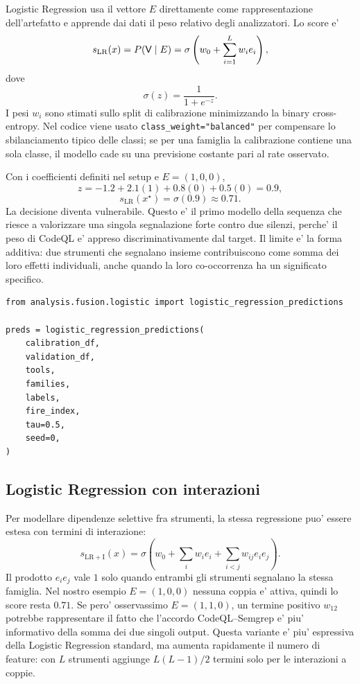 Logistic Regression usa il vettore $E$ direttamente come rappresentazione dell'artefatto e apprende dai dati il peso relativo degli analizzatori. Lo score e'
\begin{equation}
s_{\mathrm{LR}}(x)=P(\mathsf{V}\mid E)=\sigma\left(w_0+\sum_{i=1}^{L}w_i e_i\right),
\end{equation}
dove
\begin{equation}
\sigma(z)=\frac{1}{1+e^{-z}}.
\end{equation}
I pesi $w_i$ sono stimati sullo split di calibrazione minimizzando la binary cross-entropy. Nel codice viene usato \texttt{class\_weight="balanced"} per compensare lo sbilanciamento tipico delle classi; se per una famiglia la calibrazione contiene una sola classe, il modello cade su una previsione costante pari al rate osservato.

Con i coefficienti definiti nel setup e $E=(1,0,0)$,
\begin{equation}
z=-1.2+2.1(1)+0.8(0)+0.5(0)=0.9,
\end{equation}
\begin{equation}
s_{\mathrm{LR}}(x^\star)=\sigma(0.9)\approx 0.71.
\end{equation}
La decisione diventa vulnerabile. Questo e' il primo modello della sequenza che riesce a valorizzare una singola segnalazione forte contro due silenzi, perche' il peso di CodeQL e' appreso discriminativamente dal target. Il limite e' la forma additiva: due strumenti che segnalano insieme contribuiscono come somma dei loro effetti individuali, anche quando la loro co-occorrenza ha un significato specifico.

\begin{lstlisting}[caption={Implementazione Logistic Regression in analysis/fusion/logistic.py}]
from analysis.fusion.logistic import logistic_regression_predictions

preds = logistic_regression_predictions(
    calibration_df,
    validation_df,
    tools,
    families,
    labels,
    fire_index,
    tau=0.5,
    seed=0,
)
\end{lstlisting}

\subsection{Logistic Regression con interazioni}

Per modellare dipendenze selettive fra strumenti, la stessa regressione puo' essere estesa con termini di interazione:
\begin{equation}
s_{\mathrm{LR+I}}(x)=
\sigma\left(
w_0+\sum_i w_i e_i+\sum_{i<j}w_{ij}e_i e_j
\right).
\end{equation}
Il prodotto $e_i e_j$ vale $1$ solo quando entrambi gli strumenti segnalano la stessa famiglia. Nel nostro esempio $E=(1,0,0)$ nessuna coppia e' attiva, quindi lo score resta $0.71$. Se pero' osservassimo $E=(1,1,0)$, un termine positivo $w_{12}$ potrebbe rappresentare il fatto che l'accordo CodeQL--Semgrep e' piu' informativo della somma dei due singoli output. Questa variante e' piu' espressiva della Logistic Regression standard, ma aumenta rapidamente il numero di feature: con $L$ strumenti aggiunge $L(L-1)/2$ termini solo per le interazioni a coppie.

